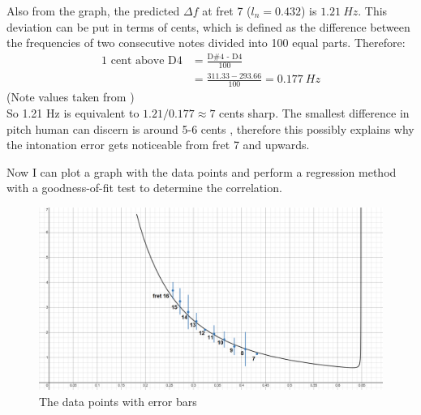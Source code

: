 \documentclass[11pt]{article}
\begin{document}
\begin{flushleft}
                Also from the graph, the predicted $\Delta f$ at fret 7 ($l_n = 0.432$) is $\SI{1.21}{Hz}$. This deviation can be put in terms of cents, which is defined as the difference between the frequencies of two consecutive notes divided into 100 equal parts. \cite{cents} Therefore:
                \begin{align*}
                    \text{1 cent above D4} &= \frac{\text{D\#4 - D4}}{100} \\  
                    &= \frac{311.33-293.66}{100} = \SI{0.177}{Hz} 
                \end{align*}
                (Note values taken from \cite{freq_chart}) \\
                So 1.21 Hz is equivalent to $1.21/0.177 \approx 7$ cents sharp. The smallest difference in pitch human can discern is around 5-6 cents \cite{loeffler}, therefore this possibly explains why the intonation error gets noticeable from fret 7 and upwards. \par
                Now I can plot a graph with the data points and perform a regression method with a goodness-of-fit test to determine the correlation.
                \begin{figure}[!h]
                    \includegraphics[width = \textwidth]{graph_with_data.png}
                    \caption{The data points with error bars} \label{fig10}
                \end{figure}

\end{flushleft}
\end{document}
